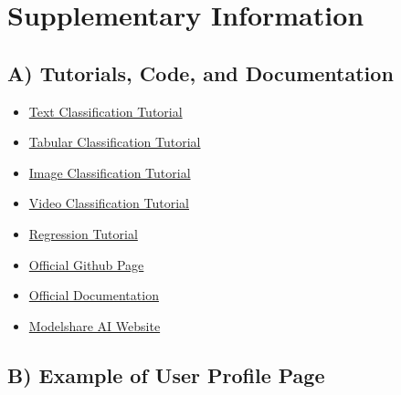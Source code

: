 \section{Supplementary Information}
\appendix

\subsection{A) Tutorials, Code, and Documentation}
\label{app:tutorials}

\begin{itemize}

\item 
\href{https://colab.research.google.com/github/AIModelShare/aimodelshare_tutorials/blob/main/modelshareai/Text_Classification_QuickStart_IMDB.ipynb}{Text Classification Tutorial}

\item 
\href{https://colab.research.google.com/github/AIModelShare/aimodelshare_tutorials/blob/main/modelshareai/QST_Tabular_Classification.ipynb}{Tabular Classification Tutorial}

\item 
\href{https://colab.research.google.com/github/AIModelShare/aimodelshare_tutorials/blob/main/modelshareai/Keras_Image_Classification_Quick_Start_Tutorial.ipynb}{Image Classification Tutorial}

\item 
\href{https://colab.research.google.com/github/AIModelShare/aimodelshare_tutorials/blob/main/modelshareai/Keras_Video_Classification_Quick_Start_Tutorial(1).ipynb}{Video Classification Tutorial}

\item 
\href{https://www.modelshare.ai/notebooks/notebook:229}{Regression Tutorial}

\item 
\href{https://github.com/AIModelShare/aimodelshare}{Official Github Page}

\item 
\href{https://aimodelshare.readthedocs.io/en/latest/index.html}{Official Documentation}

\item 
\href{https://www.modelshare.ai/}{Modelshare AI Website}


\end{itemize}

\newpage
\subsection{B) Example of User Profile Page}
\label{app:profile_page}

